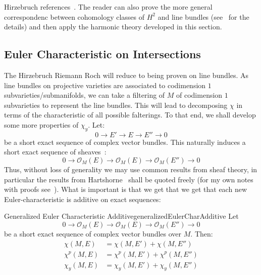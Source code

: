 \documentclass{book}
\newenvironment{Proof}[1][]
  {\begin{ProofTcb}[#1]}
  {\end{ProofTcb}}
\newcommand{\CO}{{\mathcal{O}}}
\begin{document}
\begin{Proof}
  Hirzebruch references~\cite[p.127, Thm~15.9.1]{hirzebruchTopologicalMethodsAlgebraic1995}. The reader can
  also prove the more general correspondenc between cohomology classes of $H^2$ and line bundles
  (see~\cite{NateKTheory} for the details) and then apply the harmonic theory developed in this section.
\end{Proof}

\subsection{Euler Characteristic on Intersections}\label{sec:propGenerlizedEulerChar}

The Hirzebruch Riemann Roch will reduce to being proven on line bundles. As line bundles on projective
varieties are associated to codimension $1$ subvarieties/submanifolds, we can take a filtering of $M$ of codimension $1$
subvarieties to represent the line bundles. This will lead to decomposing $\chi$ in terms of the characteristic
of all possible falterings. To that end, we shall develop some more properties of $\chi_y$. Let:
\[
  0 \to E' \to E \to E'' \to 0
\]
be a short exact sequence of complex vector bundles. This naturally induces a short exact sequence of
sheaves~\cite{NateAlgGeo}:
\[
  0 \to \CO_M(E) \to \CO_M(E) \to \CO_M({E''}) \to 0
\]
Thus, without loss of generality we may use common results from sheaf theory, in particular the results from
Hartshorne~\cite{hartshorneAlgebraicGeometry2013} shall be quoted freely (for my own notes with proofs
see~\cite{NateAlgGeo}). What is important is that we get that we get that each new Euler-characteristic is
additive on exact sequences:

\begin{thm}{Generalized Euler Characteristic Additive}{generalizedEulerCharAdditive}
  Let
\[
  0 \to \CO_M(E) \to \CO_M(E) \to \CO_M({E''}) \to 0
\]
  be a short exact sequence of complex vector bundles over $M$. Then:
  \begin{align*}
   \chi(M, E) &= \chi(M, E') + \chi(M, E'')\\
   \chi^p(M, E) &= \chi^p(M, E') + \chi^p(M, E'')\\
   \chi_y(M, E) &= \chi_y(M, E') + \chi_y(M, E'')
  \end{align*}
\end{thm}
\end{document}

